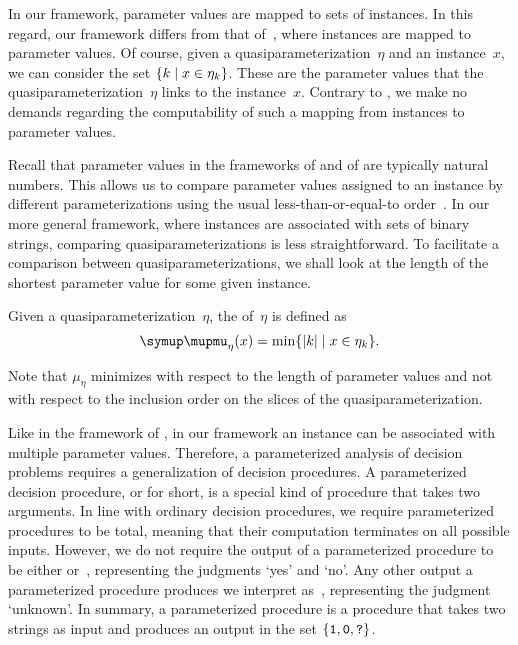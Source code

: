 In our framework, parameter values are mapped to sets of instances.
In this regard, our framework differs from that of~\textcite{flum2006parameterized}, where instances are mapped to parameter values.
Of course, given a quasiparameterization~$\eta$ and an instance~$x$, we can consider the set $\{k \;|\; x \in \eta_k\}$.
These are the parameter values that the quasiparameterization~$\eta$ links to the instance~$x$.
Contrary to \citeauthor{flum2006parameterized}, we make no demands regarding the computability of such a mapping from instances to parameter values.

Recall that parameter values in the frameworks of \textcite{downey1999parameterized} and of \textcite{flum2006parameterized} are typically natural numbers.
This allows us to compare parameter values assigned to an instance by different parameterizations using the usual less-than-or-equal-to order~\parencite{komusiewicz2012new}.
In our more general framework, where instances are associated with sets of binary strings, comparing quasiparameterizations is less straightforward.
To facilitate a comparison between quasiparameterizations, we shall look at the length of the shortest parameter value for some given instance.
\begin{definition}
  Given a quasiparameterization~$\eta$, the  of~$\eta$ is defined as
  \begin{equation*}
    \mu_\eta(x) \deq \min\{\length{k} \st x \in \eta_k\}.
  \end{equation*}
\end{definition}
Note that $\mu_\eta$ minimizes with respect to the length of parameter values and not with respect to the inclusion order on the slices of the quasiparameterization.

Like in the framework of \textcite{downey1999parameterized}, in our framework an instance can be associated with multiple parameter values.
Therefore, a parameterized analysis of decision problems requires a generalization of decision procedures.
A parameterized decision procedure, or  for short, is a special kind of procedure that takes two arguments.
In line with ordinary decision procedures, we require parameterized procedures to be total, meaning that their computation terminates on all possible inputs.
However, we do not require the output of a parameterized procedure to be either  or~, representing the judgments `yes' and `no'.
Any other output a parameterized procedure produces we interpret as~, representing the judgment `unknown'.
In summary, a parameterized procedure is a procedure that takes two strings as input and produces an output in the set $\{\textnormal{\texttt{1}}, \textnormal{\texttt{0}}, \textnormal{\texttt{?}}\}$.

